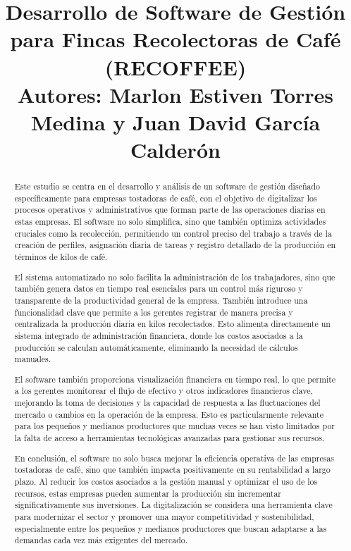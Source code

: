 \documentclass[a4paper,12pt]{article}
\title{
    \textbf{Desarrollo de Software de Gestión para Fincas Recolectoras de Café (RECOFFEE)} \\
    \vspace{0.5cm}
    \large
    \textbf{Autores: Marlon Estiven Torres Medina y Juan David García Calderón}
}
\author{}
\date{}
\begin{document}
\maketitle
\vspace{-1cm}

\begin{abstract}
Este estudio se centra en el desarrollo y análisis de un software de gestión diseñado específicamente para empresas tostadoras de café, con el objetivo de digitalizar los procesos operativos y administrativos que forman parte de las operaciones diarias en estas empresas. El software no solo simplifica, sino que también optimiza actividades cruciales como la recolección, permitiendo un control preciso del trabajo a través de la creación de perfiles, asignación diaria de tareas y registro detallado de la producción en términos de kilos de café.

El sistema automatizado no solo facilita la administración de los trabajadores, sino que también genera datos en tiempo real esenciales para un control más riguroso y transparente de la productividad general de la empresa. También introduce una funcionalidad clave que permite a los gerentes registrar de manera precisa y centralizada la producción diaria en kilos recolectados. Esto alimenta directamente un sistema integrado de administración financiera, donde los costos asociados a la producción se calculan automáticamente, eliminando la necesidad de cálculos manuales.

El software también proporciona visualización financiera en tiempo real, lo que permite a los gerentes monitorear el flujo de efectivo y otros indicadores financieros clave, mejorando la toma de decisiones y la capacidad de respuesta a las fluctuaciones del mercado o cambios en la operación de la empresa. Esto es particularmente relevante para los pequeños y medianos productores que muchas veces se han visto limitados por la falta de acceso a herramientas tecnológicas avanzadas para gestionar sus recursos.

En conclusión, el software no solo busca mejorar la eficiencia operativa de las empresas tostadoras de café, sino que también impacta positivamente en su rentabilidad a largo plazo. Al reducir los costos asociados a la gestión manual y optimizar el uso de los recursos, estas empresas pueden aumentar la producción sin incrementar significativamente sus inversiones. La digitalización se considera una herramienta clave para modernizar el sector y promover una mayor competitividad y sostenibilidad, especialmente entre los pequeños y medianos productores que buscan adaptarse a las demandas cada vez más exigentes del mercado.
\end{abstract}
\end{document}
